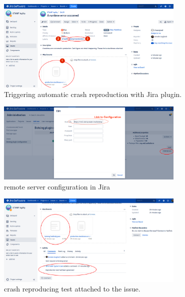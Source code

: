 \begin{figure}
    \includegraphics[width=0.8\textwidth]{conclusion/figures/deliverables_wp4_d44_images_jira-doing-reproduction.png}
    \caption{Triggering automatic crash reproduction with \botsing Jira plugin.}
    \label{fig:conclusion:botsingJira1}
\end{figure}

\begin{figure}
    \includegraphics[width=0.8\textwidth]{conclusion/figures/deliverables_wp4_d44_images_jira-botsing-server-configuration.png}
    \caption{\botsing remote server configuration in Jira}
    \label{fig:conclusion:botsingJira2}
\end{figure}


\begin{figure}
    \includegraphics[width=0.8\textwidth]{conclusion/figures/deliverables_wp4_d44_images_jira-reproduction-done.png}
    \caption{crash reproducing test attached to the issue.}
    \label{fig:conclusion:botsingJira3}
\end{figure}


